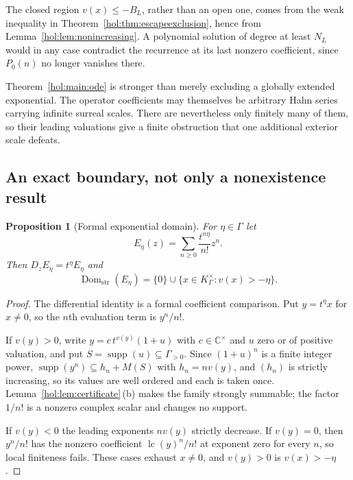 \documentclass[11pt]{article}
\numberwithin{equation}{section}
\newtheorem{proposition}[theorem]{Proposition}
\theoremstyle{definition}
\theoremstyle{remark}
\newcommand{\C}{\mathbb C}
\newcommand{\K}{K_\Gamma}
\newcommand{\supp}{\operatorname{supp}}
\newcommand{\lc}{\operatorname{lc}}
\newcommand{\Dom}{\operatorname{Dom}_{\mathrm{str}}}
\begin{document}
The closed region $v(x)\le-B_L$, rather than an open one, comes from the weak
inequality in Theorem~\ref{hol:thm:escapeexclusion}, hence from
Lemma~\ref{hol:lem:nonincreasing}. A polynomial solution of degree at least
$N_L$ would in any case contradict the recurrence at its last nonzero
coefficient, since $P_0(n)$ no longer vanishes there.

Theorem~\ref{hol:main:ode} is stronger than merely excluding a globally
extended exponential. The operator coefficients may themselves be arbitrary
Hahn series carrying infinite surreal scales. There are nevertheless only
finitely many of them, so their leading valuations give a finite obstruction
that one additional exterior scale defeats.

\subsection{An exact boundary, not only a nonexistence result}
\label{hol:sub:expdomain}

\begin{proposition}[Formal exponential domain]\label{hol:prop:expdomain}
For $\eta\in\Gamma$ let
\[
 E_\eta(z)=\sum_{n\ge0}\frac{t^{n\eta}}{n!}z^n.
\]
Then $D_zE_\eta=t^\eta E_\eta$ and
\begin{equation}\label{hol:eq:expdomain}
 \Dom(E_\eta)=\{0\}\cup\{x\in\K^\times:v(x)>-\eta\}.
\end{equation}
\end{proposition}

\begin{proof}
The differential identity is a formal coefficient comparison. Put $y=t^\eta x$
for $x\ne0$, so the $n$th evaluation term is $y^n/n!$.

If $v(y)>0$, write $y=c\,t^{v(y)}(1+u)$ with $c\in\C^\times$ and $u$ zero or
of positive valuation, and put $S=\supp(u)\subseteq\Gamma_{>0}$. Since
$(1+u)^n$ is a finite integer power, $\supp(y^n)\subseteq h_n+M(S)$ with
$h_n=nv(y)$, and $(h_n)$ is strictly increasing, so its values are well
ordered and each is taken once. Lemma~\ref{hol:lem:certificate}\,(b) makes the
family strongly summable; the factor $1/n!$ is a nonzero complex scalar and
changes no support.

If $v(y)<0$ the leading exponents $nv(y)$ strictly decrease. If $v(y)=0$, then
$y^n/n!$ has the nonzero coefficient $\lc(y)^n/n!$ at exponent zero for every
$n$, so local finiteness fails. These cases exhaust $x\ne0$, and $v(y)>0$ is
$v(x)>-\eta$.
\end{proof}
\end{document}
